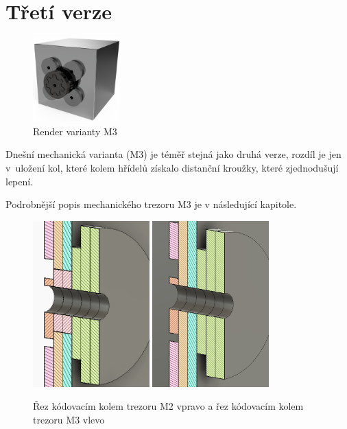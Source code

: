\section{Třetí verze}
\label{M3-vyvoj}

\begin{figure}
    \centering
    \includegraphics[width=0.3\textwidth]{kapitoly/obrazky/M3/predni_render.png}
    \caption{Render varianty M3}
    \label{fig:M3-miny-render}
\end{figure}

Dnešní mechanická varianta (M3) je téměř stejná jako druhá verze, rozdíl je jen v~uložení kol, které kolem hřídelů získalo distanční kroužky, které
zjednodušují lepení. 

Podrobnější popis mechanického trezoru M3 je v následující kapitole. 

\begin{figure}[h]
    \centering
    \vspace{40mm}
    \includegraphics[width=0.4\textwidth]{kapitoly/obrazky/M3/rez.png}
    \includegraphics[width=0.4\textwidth]{kapitoly/obrazky/M2/rez.png}
    \caption{Řez kódovacím kolem trezoru M2 vpravo a řez kódovacím kolem trezoru M3 vlevo \centering}
    \label{fig:M3-rez-kolem}
\end{figure}